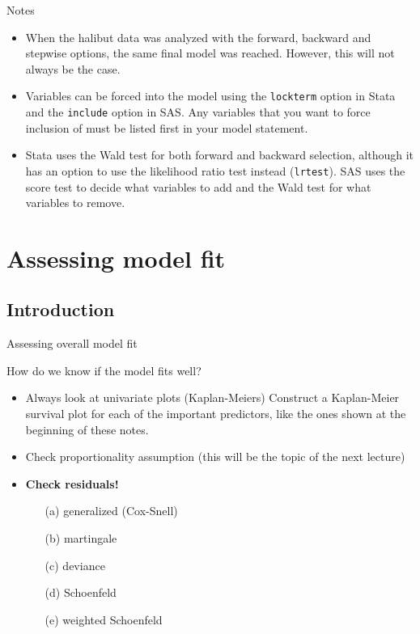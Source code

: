 \documentclass[envcountsect, 10pt, portrait, palatino]{beamer}
\begin{document}
\begin{frame}{ Notes}
\begin{itemize}
\item  When the halibut data was analyzed with the forward, backward and
stepwise options,  the same final model was reached.
However, this will not always be the case.

\vspace{0.15in}
\item  Variables can be forced into the model using the {\tt lockterm}
option in Stata and the {\tt include} option in SAS.  Any variables
that you want to force inclusion of must be
listed first in your model statement.

\vspace{0.15in}
\item  Stata uses the Wald test for both forward and backward
selection, although it has an option to use the likelihood ratio test
instead ({\tt lrtest}).  SAS uses the score test to decide what
variables to add and the Wald test for what variables
to remove.
\end{itemize}
\end{frame}
\section{Assessing model fit}
\subsection{Introduction}
\begin{frame}{Assessing overall model fit}

How do we know if the model fits well?
\begin{itemize}
\item  Always look at univariate plots (Kaplan-Meiers)
Construct a Kaplan-Meier survival plot for each
of the important predictors, like the ones shown at the
beginning of these notes.
\item  Check proportionality assumption (this will be the topic of the
next lecture)
\item  {\bf Check residuals!}\\
\begin{itemize}
\item[(a)] generalized (Cox-Snell)
\item[(b)] martingale
\item[(c)] deviance
\item[(d)] Schoenfeld
\item[(e)] weighted Schoenfeld
\end{itemize}
\end{itemize}
\end{frame}
\end{document}
